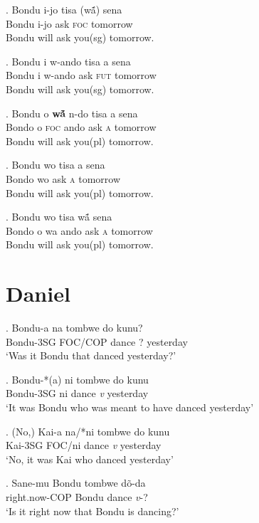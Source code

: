 \documentclass{assets/fieldnotes}
\begin{document}
\exg. Bondu i-jo tisa (wã́) sena\\
Bondu i-jo ask \textsc{foc} tomorrow\\
Bondu will ask you(sg) tomorrow.

\exg. Bondu i w-ando tisa a sena\\
Bondu i w-ando ask \textsc{fut} tomorrow\\
Bondu will ask you(sg) tomorrow.

\exg. Bondu o \textbf{wã́} n-do tisa a sena\\
Bondo o \textsc{foc} ando ask \textsc{a} tomorrow\\
Bondu will ask you(pl) tomorrow.

\exg. Bondu wo tisa a sena\\
Bondo wo ask \textsc{a} tomorrow\\
Bondu will ask you(pl) tomorrow.

\exg. Bondu wo tisa wã́  sena\\
Bondo o wa ando ask \textsc{a} tomorrow\\
Bondu will ask you(pl) tomorrow.


\section{Daniel}

\exg. Bondu-a na tombwe do kunu?\\
Bondu-3SG FOC/COP dance ? yesterday\\
`Was it Bondu that danced yesterday?'

\exg. Bondu-*(a) ni tombwe do kunu\\
Bondu-3SG ni dance \textit{v} yesterday\\
`It was Bondu who was meant to have danced yesterday'

\exg. (No,) Kai-a na/*ni tombwe do kunu\\
{} Kai-3SG FOC/ni dance \textit{v} yesterday\\
`No, it was Kai who danced yesterday'\\

\exg. San\textipa{\textbardotlessj}e-mu Bondu tombwe dõ-da\\
right.now-COP Bondu dance \textit{v}-?\\
`Is it right now that Bondu is dancing?'
\end{document}
